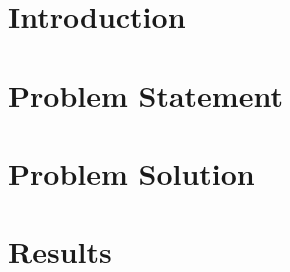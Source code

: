 \documentclass[conference]{IEEEtran}
\begin{document}
\maketitle

\begin{abstract}
\end{abstract}

\begin{IEEEkeywords}
\end{IEEEkeywords}

\section{Introduction}
\section{Problem Statement}
\section{Problem Solution}
\section{Results}
\end{document}

